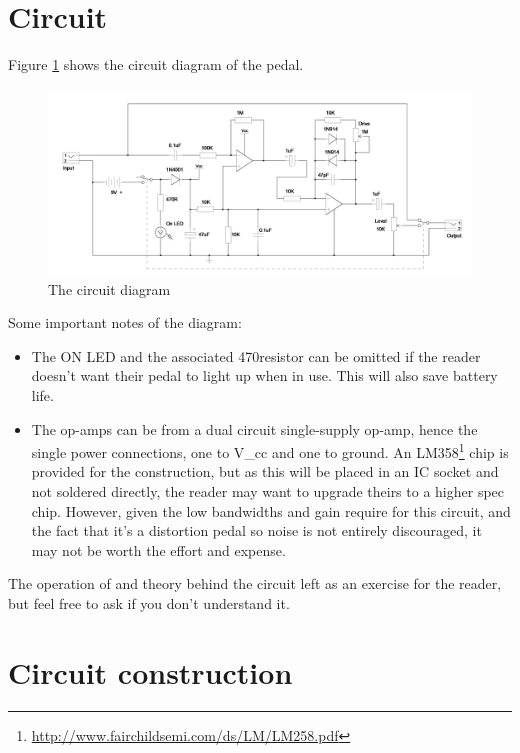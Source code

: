 \documentclass[a4paper]{article}
\begin{document}
\section{Circuit}
	Figure \ref{fig:schematic} shows the circuit diagram of the pedal.
	
	\begin{figure}[ht]
		\centering
		\includegraphics[angle=90, scale=0.18]{schematic.png}
		\caption{The circuit diagram}
		\label{fig:schematic}
	\end{figure}

	Some important notes of the diagram: 
	\begin{itemize}
		\item 	The ON LED and the associated 
				470\ohm resistor can be omitted if the reader doesn't want their 
				pedal to light up when in use. This will also save battery life.
	
		\item 	The op-amps can be from a dual circuit single-supply op-amp, hence
				the single power connections, one to V\_cc and one to ground.
				An LM358\footnote{\url{http://www.fairchildsemi.com/ds/LM/LM258.pdf}}
				chip is provided for the construction, but as this will be placed
				in an IC socket and not soldered directly, the reader may want to
				upgrade theirs to a higher spec chip. However, given the low bandwidths
				and gain require for this circuit, and the fact that it's a distortion pedal
				so noise is not entirely discouraged, it may not be worth the effort and 
				expense.
	\end{itemize}
	
	The operation of and theory behind the circuit left as an exercise for the reader,
	but feel free to ask if you don't understand it.
	\newpage
\section{Circuit construction}
\end{document}
